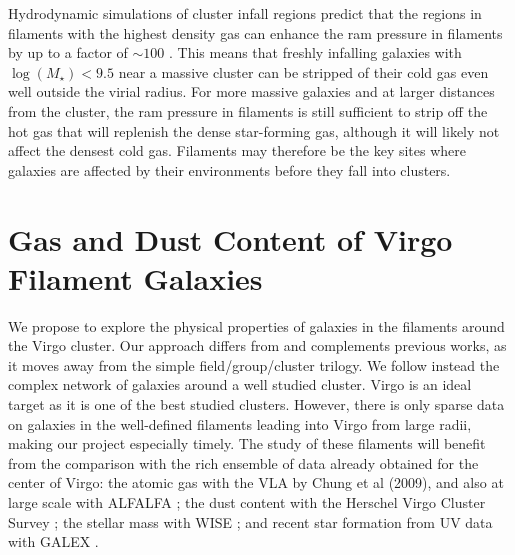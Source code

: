 \documentclass[11pt, preprint]{aastex}
\begin{document}
Hydrodynamic simulations of cluster infall regions predict that
the regions in filaments with the highest density gas can enhance the ram pressure in
filaments by up to a factor of $\sim 100$ \citep{bahe13}.  This 
means that freshly infalling galaxies with $\log(M_\star)<9.5$ near a massive
cluster can be stripped of their cold gas even well outside the virial
radius.  For more massive galaxies and at larger distances from the
cluster, the ram pressure in filaments is still sufficient to strip
off the hot gas that will replenish the dense star-forming gas,
although it will likely not affect the densest cold gas.  
Filaments may therefore be the key
sites where galaxies are affected by their environments before they fall into
clusters. 

\vspace*{-.8cm}
\section{Gas and Dust Content of Virgo Filament Galaxies}
\vspace*{-.4cm}
We propose to explore the physical properties of
galaxies in the filaments around the Virgo cluster.   Our approach
differs from and complements previous works, as it moves away from the
simple field/group/cluster trilogy. We follow instead the complex
network of galaxies around a well studied cluster.  Virgo is an ideal
target as it is one of the best studied clusters.  However, there is
only sparse data on galaxies in the well-defined filaments leading
into Virgo from large radii, making our project especially timely.
The study of these filaments will benefit from the comparison with the rich
ensemble of data already obtained for the center of Virgo: the atomic
gas with the VLA by Chung
et al (2009), and also at large scale with ALFALFA \citep{giovanelli05}; the
dust content with the Herschel Virgo Cluster Survey \citep{davies10};
the stellar mass with WISE \citep{ferrarese12}; and recent star formation
from UV data with GALEX \citep{boselli11}. 



\end{document}
